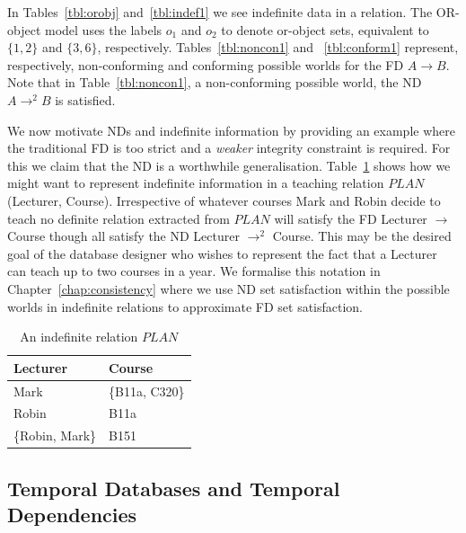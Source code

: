 In Tables~\ref{tbl:orobj} and~\ref{tbl:indef1} we see indefinite data
in a relation. The OR-object model uses the labels $o_1$ and $o_2$ to
denote or-object sets, equivalent to $\{1,2\}$ and $\{3,6\}$,
respectively. Tables~\ref{tbl:noncon1} and ~\ref{tbl:conform1}
represent, respectively, non-conforming and conforming possible worlds
for the FD $A \to B$. Note that in Table~\ref{tbl:noncon1}, a non-conforming
possible world, the ND $A \to^2 B$ is satisfied.

\medskip
{}
We now motivate NDs and indefinite information by providing an example
where
the traditional FD is too strict and a {\em weaker} integrity constraint
is required. For this we claim that the ND is a worthwhile generalisation.
Table~\ref{tbl:lc} shows how we might
want to represent indefinite information in a teaching relation 
$PLAN$(Lecturer, Course).  Irrespective of whatever courses Mark and Robin
 decide to teach no definite relation extracted from $PLAN$
will satisfy the FD Lecturer $\to$ Course though all satisfy the 
ND Lecturer $\to^2$ Course. This may be the desired goal of the 
database designer who wishes to represent the fact that a Lecturer can
teach up to two courses in a year. We formalise this notation in
Chapter~\ref{chap:consistency} where we use ND set satisfaction within
the possible worlds in indefinite relations to approximate FD set satisfaction.

{\line
\begin{table}[ht]
\begin{center}
\begin{tabular}{||l|l||} \hline
Lecturer & Course \\ \hline
 Mark & \{B11a, C320\} \\
 Robin & B11a \\
 \{Robin, Mark\} & B151 \\ \hline
\end{tabular}
\end{center}
\caption{\label{tbl:lc} An indefinite relation $PLAN$} 
\end{table}
}


\subsection{Temporal Databases and Temporal Dependencies}\label{subsec:temdat}

